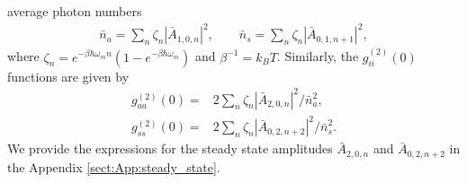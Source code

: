 average photon numbers
\begin{align}
	\bar n_a=\sum_n \zeta_n |\bar A_{1,0,n}|^2,
	\qquad
	\bar n_s=\sum_n \zeta_n |\bar A_{0,1,n+1}|^2,
\end{align}
where $\zeta_n=e^{-\beta \hbar\omega_m n}(1-e^{-\beta \hbar\omega_m })$ and
$\beta^{-1}=k_B T$.
Similarly, the $g^{(2)}_{ii}(0)$ functions are given by 
\begin{align}
	g^{(2)}_{aa}(0)=&2\sum_n\zeta_n |\bar A_{2,0,n}|^2 / \bar n_a^2,\\
	g^{(2)}_{ss}(0)=&2\sum_n\zeta_n |\bar A_{0,2,n+2}|^2 / \bar n_s^2.
\end{align} 
We provide the expressions for the steady state amplitudes
$\bar A_{2,0,n}$ and $\bar A_{0,2,n+2}$ in the
 Appendix \ref{sect:App:steady_state}.

 





